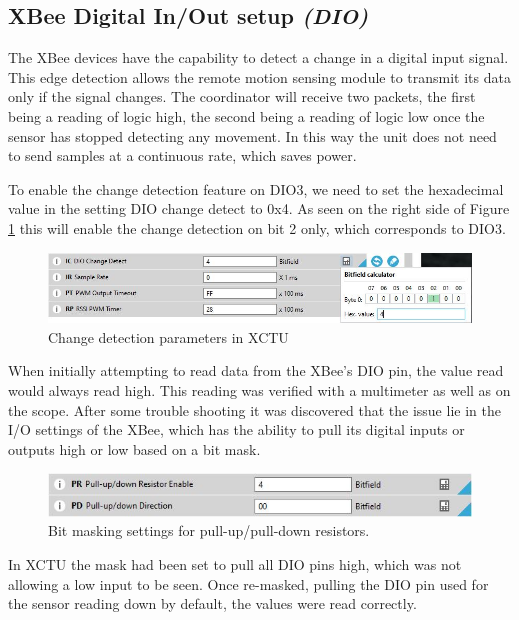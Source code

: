 	\subsection{XBee Digital In/Out setup \textit{(DIO)}}
	\par The XBee devices have the capability to detect a change in a digital input signal. This edge detection allows the remote motion sensing module to transmit its data only if the signal changes. The coordinator will receive two packets, the first being a reading of logic high, the second being a reading of logic low once the sensor has stopped detecting any movement. In this way the unit does not need to send samples at a continuous rate, which saves power.
	\par To enable the change detection feature on DIO3, we need to set the hexadecimal value in the setting DIO change detect to 0x4. As seen on the right side of Figure \ref{fig:changeDet} this will enable the change detection on bit 2 only, which corresponds to DIO3. 
	\begin{figure}[h]
		\centering
		\includegraphics[width=\linewidth]{changeDetect.JPG}
		\caption{Change detection parameters in XCTU}
		\label{fig:changeDet}
	\end{figure}
	\par When initially attempting to read data from the XBee's DIO pin, the value read would always read high. This reading was verified with a multimeter as well as on the scope. After some trouble shooting it was discovered that the issue lie in the I/O settings of the XBee, which has the ability to pull its digital inputs or outputs high or low based on a bit mask. 
	\begin{figure}[h]
		\centering
		\includegraphics[width=\linewidth]{bitMask.JPG}
		\caption{Bit masking settings for pull-up/pull-down resistors.}
		\label{fig:bitMask}
	\end{figure}
	\par In XCTU the mask had been set to pull all DIO pins high, which was not allowing a low input to be seen. Once re-masked, pulling the DIO pin used for the sensor reading down by default, the values were read correctly.
	
